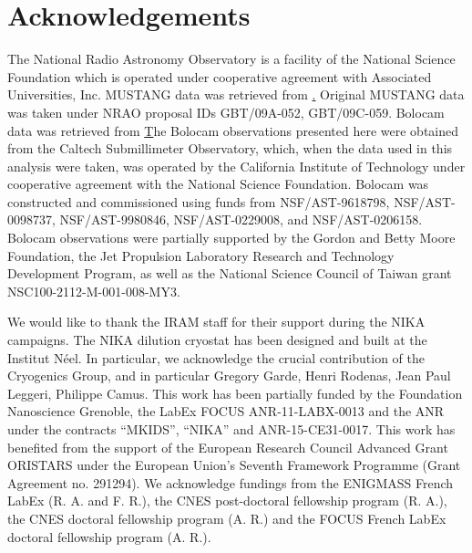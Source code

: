\documentclass[twocolumn,traditabstract]{aa}
\begin{document}
\section*{Acknowledgements}

The National Radio Astronomy Observatory is a facility of the National Science Foundation which is operated
under cooperative agreement with Associated Universities, Inc. MUSTANG data was retrieved from
\href{https://safe.nrao.edu/wiki/bin/view/GB/Pennarray/MUSTANG_CLASH}. Original MUSTANG data was
taken under NRAO proposal IDs GBT/09A-052, GBT/09C-059. Bolocam data was retrieved from
\href{http://irsa.ipac.caltech.edu/data/Planck/release\_2/ancillary-data/bolocam/}
The Bolocam observations presented here were obtained from the Caltech Submillimeter Observatory, which,
when the data used in this analysis were taken, was operated by the California Institute of Technology under
cooperative agreement with the National Science Foundation. Bolocam was constructed and commissioned using funds
from NSF/AST-9618798, NSF/AST-0098737, NSF/AST-9980846, NSF/AST-0229008, and NSF/AST-0206158. Bolocam observations
were partially supported by the Gordon and Betty Moore Foundation, the Jet Propulsion Laboratory Research and
Technology Development Program, as well as the National Science Council of Taiwan grant NSC100-2112-M-001-008-MY3.

We would like to thank the IRAM staff for their support during the NIKA campaigns. 
The NIKA dilution cryostat has been designed and built at the Institut N\'eel. 
In particular, we acknowledge the crucial contribution of the Cryogenics Group, and 
in particular Gregory Garde, Henri Rodenas, Jean Paul Leggeri, Philippe Camus. 
This work has been partially funded by the Foundation Nanoscience Grenoble, the LabEx FOCUS ANR-11-LABX-0013 and 
the ANR under the contracts ``MKIDS'', ``NIKA'' and ANR-15-CE31-0017. 
This work has benefited from the support of the European Research Council Advanced Grant ORISTARS 
under the European Union's Seventh Framework Programme (Grant Agreement no. 291294).
We acknowledge fundings from the ENIGMASS French LabEx (R. A. and F. R.), 
the CNES post-doctoral fellowship program (R. A.),  the CNES doctoral fellowship program (A. R.) and 
the FOCUS French LabEx doctoral fellowship program (A. R.).


\end{document}
